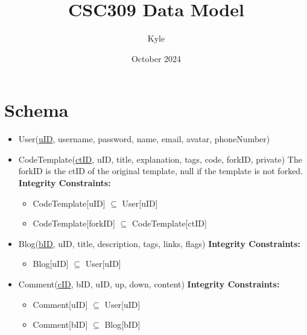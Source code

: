 \documentclass{article}
\title{CSC309 Data Model}
\author{Kyle}
\date{October 2024}
\begin{document}
\maketitle

\section*{Schema}

\begin{itemize}
\item
User(\underline{uID}, username, password, name, email, avatar, phoneNumber)

\item 
CodeTemplate(\underline{ctID}, uID, title, explanation, tags, code, forkID, private)
The forkID is the ctID of the original template, null if the template is not forked.
\textbf{Integrity Constraints:}
\begin{itemize}
\item CodeTemplate[uID] $\subseteq$ User[uID]
\item CodeTemplate[forkID] $\subseteq$ CodeTemplate[ctID]
\end{itemize}

\item 
Blog(\underline{bID}, uID, title, description, tags, links, flags)
\textbf{Integrity Constraints:}
\begin{itemize}
\item Blog[uID] $\subseteq$ User[uID]
\end{itemize}

\item
Comment(\underline{cID}, bID, uID, up, down, content)
\textbf{Integrity Constraints:}
\begin{itemize}
\item Comment[uID] $\subseteq$ User[uID]
\item Comment[bID] $\subseteq$ Blog[bID]
\end{itemize}




\end{itemize}
\end{document}
